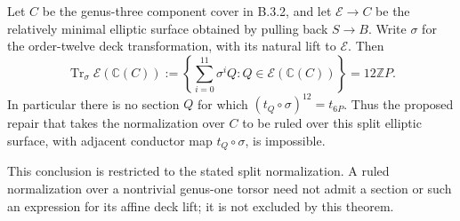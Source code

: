 \begin{theorem}\label{push:B34}
Let $C$ be the genus-three component cover
in B.3.2, and let $\mathscr E\to C$ be
the relatively minimal elliptic surface
obtained by pulling back $S\to B$.
Write $\sigma$ for the order-twelve deck
transformation, with its natural lift to
$\mathscr E$. Then
\[
 \operatorname{Tr}_{\sigma}
   \mathscr E(\mathbb C(C))
 :=\left\{\sum_{i=0}^{11}\sigma^i Q:
                 Q\in\mathscr E(\mathbb C(C))\right\}
 =12\mathbb Z P.
\]
In particular there is no section $Q$
for which $(t_Q\circ\sigma)^{12}=t_{6P}$.
Thus the proposed repair that takes the
normalization over $C$ to be ruled over
this split elliptic surface, with adjacent
conductor map $t_Q\circ\sigma$, is
impossible.

This conclusion is restricted to the
stated split normalization. A ruled
normalization over a nontrivial genus-one
torsor need not admit a section or such
an expression for its affine deck lift;
it is not excluded by this theorem.
\end{theorem}
